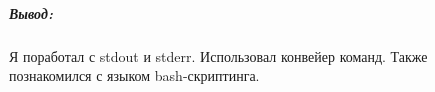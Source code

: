 \subparagraph{Вывод:}
Я поработал с stdout и stderr.
Использовал конвейер команд.
Также познакомился с языком bash-скриптинга.